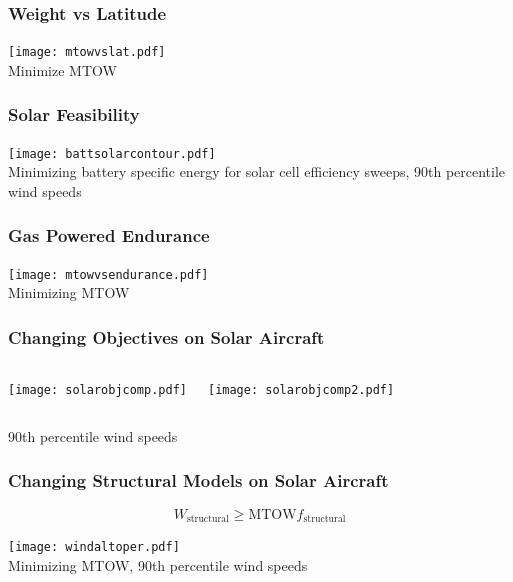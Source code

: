 \documentclass{beamer}
\begin{document}
\begin{frame}
    \frametitle{Weight vs Latitude}

    \begin{center}
    \texttt{[image: mtowvslat.pdf]} \\
    Minimize MTOW
    \end{center}

\end{frame}

\begin{frame}
    \frametitle{Solar Feasibility}

    \begin{center}
    \texttt{[image: battsolarcontour.pdf]} \\
    Minimizing battery specific energy for solar cell efficiency sweeps, 90th percentile wind speeds
    \end{center}

\end{frame}

\begin{frame}
    \frametitle{Gas Powered Endurance}

    \begin{center}
    \texttt{[image: mtowvsendurance.pdf]} \\
    Minimizing MTOW
    \end{center}

\end{frame}

\begin{frame}
    \frametitle{Changing Objectives on Solar Aircraft}

    \begin{columns}
        \texttt{[image: solarobjcomp.pdf]}
        
        \texttt{[image: solarobjcomp2.pdf]}
    \end{columns}
    \begin{center}
        90th percentile wind speeds
    \end{center}

\end{frame}

\begin{frame}
    \frametitle{Changing Structural Models on Solar Aircraft}

    \[ W_{\text{structural}} \geq \text{MTOW} f_{\text{structural}} \]

    \begin{center}
    \texttt{[image: windaltoper.pdf]} \\
    Minimizing MTOW, 90th percentile wind speeds
    \end{center}

\end{frame}
\end{document}
